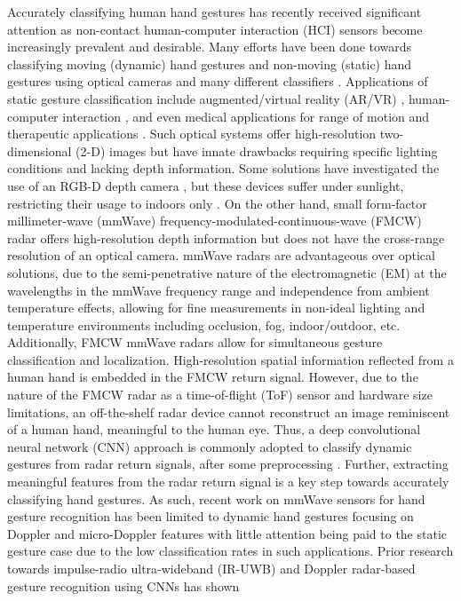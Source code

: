 \documentclass{ieeeaccess}
\begin{document}
Accurately classifying human hand gestures has recently received significant attention as non-contact human-computer interaction (HCI) sensors become increasingly prevalent and desirable. Many efforts have been done towards classifying moving (dynamic) hand gestures and non-moving (static) hand gestures using optical cameras and many different classifiers \cite{hand_pose_classification:comparison_of_classifiers}. Applications of static gesture classification include augmented/virtual reality (AR/VR) \cite{hand_pose_classification:depth_sensor_bad_sunlight}, human-computer interaction \cite{hand_pose_classification:OUHANDS_database}, and even medical applications for range of motion and therapeutic applications \cite{hand_pose_classification:medical}. Such optical systems offer high-resolution two-dimensional (2-D) images but have innate drawbacks requiring specific lighting conditions and lacking depth information. Some solutions have investigated the use of an RGB-D depth camera \cite{hand_pose_classification:depth_RGBD_camera}, but these devices suffer under sunlight, restricting their usage to indoors only \cite{hand_pose_classification:depth_sensor_bad_sunlight}. On the other hand, small form-factor millimeter-wave (mmWave) frequency-modulated-continuous-wave (FMCW) radar offers high-resolution depth information but does not have the cross-range resolution of an optical camera. mmWave radars are advantageous over optical solutions, due to the semi-penetrative nature of the electromagnetic (EM) at the wavelengths in the mmWave frequency range and independence from ambient temperature effects, allowing for fine measurements in non-ideal lighting and temperature environments including occlusion, fog, indoor/outdoor, etc. Additionally, FMCW mmWave radars allow for simultaneous gesture classification and localization. High-resolution spatial information reflected from a human hand is embedded in the FMCW return signal. However, due to the nature of the FMCW radar as a time-of-flight (ToF) sensor and hardware size limitations, an off-the-shelf radar device cannot reconstruct an image reminiscent of a human hand, meaningful to the human eye. Thus, a deep convolutional neural network (CNN) approach is commonly adopted to classify dynamic gestures from radar return signals, after some preprocessing \cite{dynamic_gesture_recognition:application_of_Dopper_DCNN}. Further, extracting meaningful features from the radar return signal is a key step towards accurately classifying hand gestures. As such, recent work on mmWave sensors for hand gesture recognition has been limited to dynamic hand gestures focusing on Doppler and micro-Doppler features \cite{dynamic_gesture_recognition:low_power,dynamic_gesture_recognition:LSTM,dynamic_gesture_recognition:micro_doppler,dynamic_gesture_recognition:svm} with little attention being paid to the static gesture case \cite{static_gesture_recognition:time_domain} due to the low classification rates in such applications. Prior research towards impulse-radio ultra-wideband (IR-UWB) \cite{ir-uwb:digit_writing,ir-uwb:dynamic_gesture,static_gesture_recognition:time_domain} and Doppler radar-based gesture recognition \cite{dynamic_gesture_recognition:low_power,dynamic_gesture_recognition:LSTM,dynamic_gesture_recognition:micro_doppler} using CNNs has shown 
\end{document}
